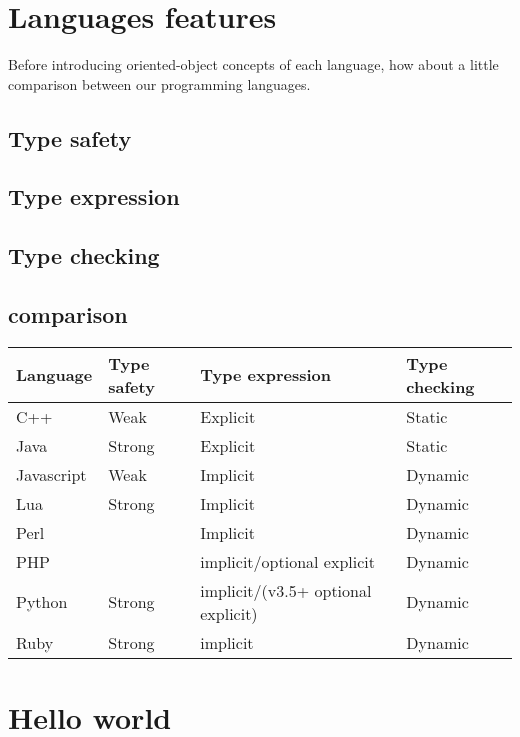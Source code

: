 \documentclass{KodeBook}
\begin{document}
\section{Languages features}

Before introducing oriented-object concepts of each language, how about a little comparison between our programming languages.

\subsection{Type safety}



\subsection{Type expression}


\subsection{Type checking}

\subsection{comparison}

\begin{table}
	\begin{tabular}{llll}
		\hline
		Language & Type safety & Type expression & Type checking \\
		\hline
		C++ & Weak & Explicit & Static \\
		\hline
		Java & Strong & Explicit & Static \\
		\hline
		Javascript & Weak & Implicit & Dynamic \\
		\hline
		Lua & Strong & Implicit & Dynamic \\
		\hline
		Perl & & Implicit & Dynamic \\
		\hline
		PHP & & implicit/optional explicit & Dynamic \\
		\hline
		Python & Strong & implicit/(v3.5+ optional explicit) & Dynamic \\
		\hline
		Ruby & Strong & implicit & Dynamic \\
		\hline
	\end{tabular}
\end{table}



\section{Hello world}
\end{document}
